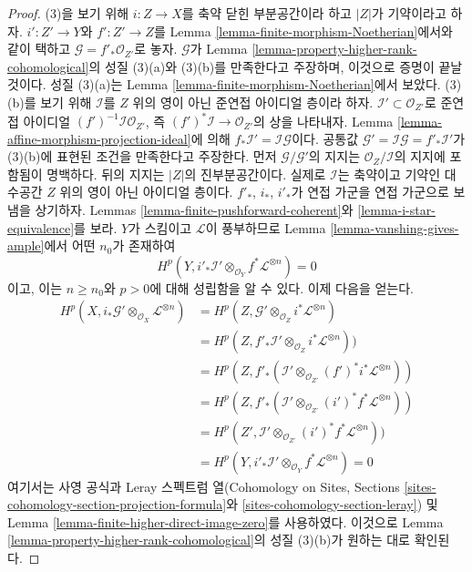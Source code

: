\begin{proof}
\medskip\noindent
(3)을 보기 위해 $i : Z \to X$를 축약 닫힌 부분공간이라 하고
$|Z|$가 기약이라고 하자. $i' : Z' \to Y$와
$f' : Z' \to Z$를 Lemma \ref{lemma-finite-morphism-Noetherian}에서와
같이 택하고 $\mathcal{G} = f'_*\mathcal{O}_{Z'}$로 놓자.
$\mathcal{G}$가 Lemma
\ref{lemma-property-higher-rank-cohomological}의 성질 (3)(a)와
(3)(b)를 만족한다고 주장하며, 이것으로 증명이 끝날 것이다. 성질
(3)(a)는 Lemma \ref{lemma-finite-morphism-Noetherian}에서 보았다.
(3)(b)를 보기 위해 $\mathcal{I}$를 $Z$ 위의 영이 아닌 준연접
아이디얼 층이라 하자.
$\mathcal{I}' \subset \mathcal{O}_{Z'}$로 준연접 아이디얼
$(f')^{-1}\mathcal{I} \mathcal{O}_{Z'}$, 즉
$(f')^*\mathcal{I} \to \mathcal{O}_{Z'}$의 상을 나타내자. Lemma
\ref{lemma-affine-morphism-projection-ideal}에 의해
$f_*\mathcal{I}' = \mathcal{I} \mathcal{G}$이다. 공통값
$\mathcal{G}' = \mathcal{I} \mathcal{G} = f'_*\mathcal{I}'$가
(3)(b)에 표현된 조건을 만족한다고 주장한다. 먼저
$\mathcal{G}/\mathcal{G}'$의 지지는
$\mathcal{O}_Z/\mathcal{I}$의 지지에 포함됨이 명백하다. 뒤의 지지는
$|Z|$의 진부분공간이다. 실제로 $\mathcal{I}$는 축약이고 기약인
대수공간 $Z$ 위의 영이 아닌 아이디얼 층이다. $f'_*$, $i_*$,
$i'_*$가 연접 가군을 연접 가군으로 보냄을 상기하자. Lemmas
\ref{lemma-finite-pushforward-coherent}와
\ref{lemma-i-star-equivalence}를 보라. $Y$가 스킴이고
$\mathcal{L}$이 풍부하므로 Lemma
\ref{lemma-vanshing-gives-ample}에서 어떤 $n_0$가 존재하여
$$
H^p(Y, i'_*\mathcal{I}' \otimes_{\mathcal{O}_Y} f^*\mathcal{L}^{\otimes n}) = 0
$$
이고, 이는 $n \geq n_0$와 $p > 0$에 대해 성립함을 알 수 있다.
이제 다음을 얻는다.
\begin{align*}
H^p(X, i_*\mathcal{G}' \otimes_{\mathcal{O}_X} \mathcal{L}^{\otimes n})
& =
H^p(Z, \mathcal{G'} \otimes_{\mathcal{O}_Z} i^*\mathcal{L}^{\otimes n}) \\
& =
H^p(Z,
f'_*\mathcal{I}' \otimes_{\mathcal{O}_Z} i^*\mathcal{L}^{\otimes n})) \\
& =
H^p(Z, f'_*(\mathcal{I}' \otimes_{\mathcal{O}_{Z'}}
(f')^*i^*\mathcal{L}^{\otimes n})) \\
& =
H^p(Z, f'_*(\mathcal{I}' \otimes_{\mathcal{O}_{Z'}}
(i')^*f^*\mathcal{L}^{\otimes n})) \\
& =
H^p(Z',
\mathcal{I}' \otimes_{\mathcal{O}_{Z'}} (i')^*f^*\mathcal{L}^{\otimes n})) \\
& =
H^p(Y, i'_*\mathcal{I}' \otimes_{\mathcal{O}_Y} f^*\mathcal{L}^{\otimes n}) = 0
\end{align*}
여기서는 사영 공식과 Leray 스펙트럼 열(Cohomology on Sites,
Sections \ref{sites-cohomology-section-projection-formula}와
\ref{sites-cohomology-section-leray}) 및 Lemma
\ref{lemma-finite-higher-direct-image-zero}를 사용하였다. 이것으로
Lemma \ref{lemma-property-higher-rank-cohomological}의 성질 (3)(b)가
원하는 대로 확인된다.
\end{proof}










